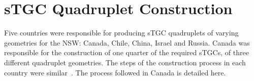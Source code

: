 


\section{sTGC Quadruplet Construction}
\label{sec:stgc_construction}

Five countries were responsible for producing sTGC quadruplets of varying geometries for the NSW: Canada, Chile, China, Israel and Russia. Canada was responsible for the construction of one quarter of the required sTGCs, of three different quadruplet geometries. The steps of the construction process in each country were similar~\cite{nsw_tdr}. The process followed in Canada is detailed here.

